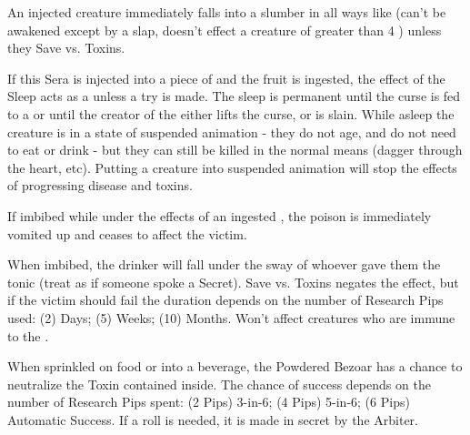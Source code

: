   \CHYMISTRY[
    Name=Grimm's Stuporous Preparation,
    Link=chymistry-grimms-stuporous-preparation,
    Type=Sera,
    Pips=5,
    Time=Weeks
  ]

  An injected creature immediately falls into a slumber in all ways like  (can't be awakened except by a slap, doesn't effect a creature of greater than 4 \HD) unless they Save vs. Toxins.

 If this Sera is injected into a piece of  and the fruit is ingested, the effect of the Sleep acts as a  unless a  try is made. The sleep is permanent until the curse is fed to a  or until the creator of the  either lifts the curse, or is slain. While asleep the creature is in a state of suspended animation - they do not age, and do not need to eat or drink - but they can still be killed in the normal means (dagger through the heart, etc). Putting a creature into suspended animation will stop the effects of progressing disease and toxins.


\CHYMISTRY[
  Name=Liebnitz Purgation,
  Link=chymistry-liebnitz-purgation,
  Type=Tonic,
  Pips=5,
  Time=Days
]


If imbibed while under the effects of an ingested , the poison is immediately vomited up and ceases to affect the victim.


\CHYMISTRY[
  Name=Philter of von Fuchs,
  Link=chymistry-philter-von-fuchs,
  Type=Tonic,
  Pips=2+,
  Time=Weeks
]

When imbibed, the drinker will fall under the sway of whoever gave them the tonic (treat as if someone spoke a  Secret). Save vs. Toxins negates the effect, but if the victim should fail the duration depends on the number of Research Pips used:  (2) Days; (5) Weeks; (10) Months. Won't affect creatures who are immune to the .


  \CHYMISTRY[
    Name=Powdered Bezoar,
    Link=chymistry-powdered-bezoar,
    Type=Powder,
    Pips=2+,
    Time=Days
  ]


  When sprinkled on food or into a beverage, the Powdered Bezoar has a chance to neutralize the Toxin contained inside. The chance of success depends on the number of Research Pips spent: (2 Pips) 3-in-6; (4 Pips) 5-in-6; (6 Pips) Automatic Success. If a roll is needed, it is made in secret by the Arbiter.



